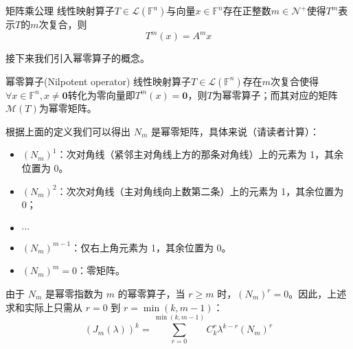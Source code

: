 \begin{axiom}{矩阵乘公理}
	线性映射算子$T\in \mathcal{L}(\mathbb{F}^n)$与向量$x\in \mathbb{F}^n$存在正整数$m \in \mathcal{N}^+$使得$T^m$表示$T$的$m$次复合，则$$T^m(x)=A^mx$$
\end{axiom}

接下来我们引入幂零算子的概念。

\begin{definition}{幂零算子(Nilpotent operator)}
	线性映射算子$T\in \mathcal{L}(\mathbb{F}^n)$存在$m$次复合使得$\forall x\in \mathbb{F}^n,x\neq \boldsymbol{0}$转化为零向量即$T^m(x)=\boldsymbol{0}$，则$T$为幂零算子；而其对应的矩阵$\mathcal{M}(T)$为幂零矩阵。
\end{definition}

根据上面的定义我们可以得出 $N_m$ 是幂零矩阵，具体来说（请读者计算）：\begin{itemize}
	\item  $(N_m)^1$：次对角线（紧邻主对角线上方的那条对角线）上的元素为 1，其余位置为 0。
	\item $(N_m)^2$：次次对角线（主对角线向上数第二条）上的元素为 1，其余位置为 0；
	\item $\cdots$
	\item $(N_m)^{m-1}$：仅右上角元素为 1，其余位置为 0。
	\item $(N_m)^m = 0$：零矩阵。
\end{itemize}

由于 $N_m$ 是幂零指数为 $m$ 的幂零算子，当 $r \geq m$ 时，$(N_m)^r = 0$。因此，上述求和实际上只需从 $r=0$ 到 $r=\min(k, m-1)$：
$$
(J_m(\lambda))^k = \sum_{r=0}^{\min(k, m-1)} C_k^r \lambda^{k-r} (N_m)^r
$$

